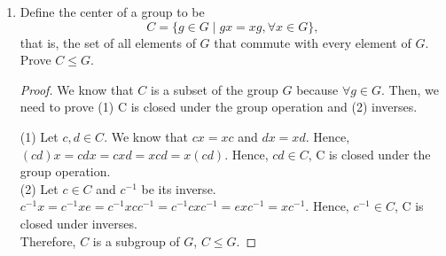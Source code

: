 \documentclass[12pt]{article}
\begin{document}
\begin{enumerate}
    \item Define the center of a group to be
        \[C = \{g \in G \mid gx = xg, \forall x \in G\},\]
        that is, the set of all elements of $G$ that commute with every element of $G$.\\
        Prove $C \leq G$.

        \begin{proof}
            We know that $C$ is a subset of the group $G$ because $ \forall g \in G$. Then, we need to prove
            (1) C is closed under the group operation and (2) inverses.

            (1) Let $c,d \in C$. We know that $cx = xc$ and $dx = xd$. Hence, $(cd)x=cdx = cxd = xcd= x(cd)$.
            Hence, $cd \in C$, C is closed under the group operation.\\
            (2) Let $c \in C$ and $c^{-1}$ be its inverse. $c^{-1}x=c^{-1}xe= c^{-1}xcc^{-1} = c^{-1}cxc^{-1} = exc^{-1} = xc^{-1}$. 
            Hence, $c^{-1} \in C$, C is closed under inverses.\\
            Therefore, $C$ is a subgroup of $G$, $C \leq G$.
        \end{proof}

	


 \end{enumerate}
\end{document}
